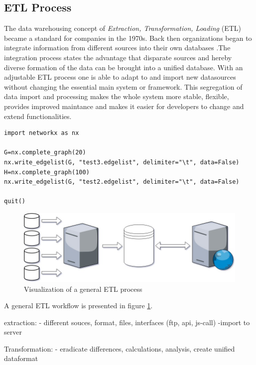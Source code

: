 \documentclass[conference, 11pt]{IEEEtran}
\begin{document}
\subsection{ETL Process}
The data warehousing concept of \textit{Extraction, Transformation, Loading} (ETL) became a standard for companies in the 1970s. Back then organizations began to integrate information from different sources into their own databases \cite{carl1}.\break The integration process states the advantage that disparate sources and hereby diverse formation of the data can be brought into a unified database. With an adjustable ETL process one is able to adapt to and import new datasources without 
changing the essential main system or framework. This segregation of data import and processing makes the whole system more stable, flexible, provides improved maintance and makes it easier for developers to change and extend functionalities. %

\begin{lstlisting}
import networkx as nx

G=nx.complete_graph(20)
nx.write_edgelist(G, "test3.edgelist", delimiter="\t", data=False)
H=nx.complete_graph(100)
nx.write_edgelist(G, "test2.edgelist", delimiter="\t", data=False)

quit()
\end{lstlisting}

\break
\break
\break

\begin{figure}[htbp]
\centerline{\includegraphics[scale=0.27]{Graphics/ETL_general.png}}
\caption{Visualization of a general ETL process}
\label{fig1_ct}
\end{figure}


A general ETL workflow is presented in figure \ref{fig1_ct}.  
\iffalse

extraction:
- different souces, format, files, interfaces (ftp, api, js-call)
-import to server

Transformation:
- eradicate differences, calculations, analysis, create unified dataformat
\end{document}
